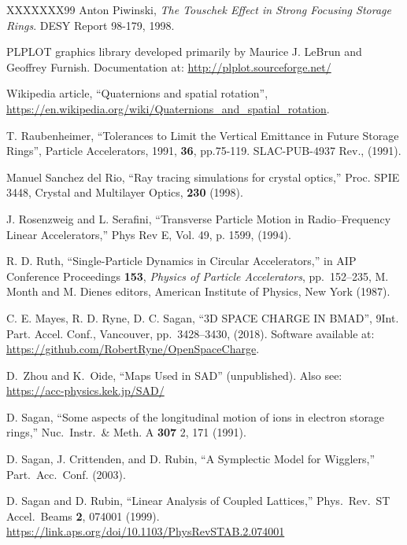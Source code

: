 \begin{thebibliography}{XXXXXXX99}
Anton Piwinski, \emph{The Touschek Effect in Strong Focusing Storage Rings}.
DESY Report 98-179, 1998.

PLPLOT graphics library developed primarily by Maurice J. LeBrun and Geoffrey Furnish. Documentation at:
\hfill\break
\hspace*{0.3in}
\url{http://plplot.sourceforge.net/}

Wikipedia article, ``Quaternions and spatial rotation'',
\hfill\break
\hspace*{20pt} 
\url{https://en.wikipedia.org/wiki/Quaternions_and_spatial_rotation}.

T. Raubenheimer,
``Tolerances to Limit the Vertical Emittance in Future Storage Rings'', 
Particle Accelerators, 1991, {\bf 36}, pp.75-119. 
SLAC-PUB-4937 Rev., (1991).

Manuel Sanchez del Rio, ``Ray tracing simulations for crystal optics,''
Proc. SPIE 3448, Crystal and Multilayer Optics, {\bf 230} (1998). 

J. Rosenzweig and L. Serafini, ``Transverse Particle Motion in
Radio--Frequency Linear Accelerators,'' Phys Rev E, Vol. 49, p. 1599,
(1994).

R. D. Ruth, ``Single-Particle Dynamics in
Circular Accelerators,'' in AIP Conference Proceedings {\bf 153}, {\em
Physics of Particle Accelerators}, pp.~152--235, M. Month and M. Dienes editors,
American Institute of Physics, New York (1987).

C. E. Mayes, R. D. Ryne, D. C. Sagan, 
``3D SPACE CHARGE IN BMAD'',
9\Th Int. Part. Accel. Conf., Vancouver, pp.~3428--3430, (2018).
Software available at: \url{https://github.com/RobertRyne/OpenSpaceCharge}.

D.~Zhou and K.~Oide, ``Maps Used in SAD'' (unpublished).
Also see:
\hfill\break
\hspace*{0.3in} \url{https://acc-physics.kek.jp/SAD/}

D. Sagan,
``Some aspects of the longitudinal motion of ions in electron storage rings,''
Nuc.\ Instr.\ \& Meth. A {\bf 307} 2, 171 (1991).


D. Sagan, J. Crittenden, and D. Rubin,
``A Symplectic Model for Wigglers,'' Part.\ Acc.\ Conf. (2003).

D. Sagan and D. Rubin, 
``Linear Analysis of Coupled Lattices,''
Phys.\ Rev.\ ST Accel.\ Beams {\bf 2}, 074001 (1999).
\hfill\break
\hspace*{20pt} 
\url{https://link.aps.org/doi/10.1103/PhysRevSTAB.2.074001}


\end{thebibliography}
